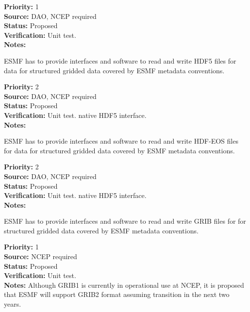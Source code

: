 \begin{reqlist}
{\bf Priority:} 1 \\
{\bf Source:} DAO, NCEP required \\
{\bf Status:} Proposed \\
{\bf Verification:} Unit test. \\
{\bf Notes:}
\end{reqlist}


ESMF has to provide interfaces and software to read and write HDF5
files for data for structured gridded data covered by ESMF metadata 
conventions. 

\begin{reqlist}
{\bf Priority:} 2 \\
{\bf Source:} DAO, NCEP required \\
{\bf Status:} Proposed \\
{\bf Verification:} Unit test. 
native HDF5 interface. \\
{\bf Notes:}
\end{reqlist}


ESMF has to provide interfaces and software to read and write HDF-EOS
files for data for structured gridded data covered by ESMF metadata 
conventions. 

\begin{reqlist}
{\bf Priority:} 2 \\
{\bf Source:} DAO, NCEP required \\
{\bf Status:} Proposed \\
{\bf Verification:} Unit test. 
native HDF5 interface. \\
{\bf Notes:}
\end{reqlist}


ESMF has to provide interfaces and software to read and write GRIB
files for for structured gridded data covered by ESMF metadata conventions. 

\begin{reqlist}
{\bf Priority:} 1 \\
{\bf Source:} NCEP required \\
{\bf Status:} Proposed \\
{\bf Verification:} Unit test. \\
{\bf Notes:} Although GRIB1 is currently in operational use at NCEP,
it is proposed that ESMF will support GRIB2 format assuming transition
in the next two years.
\end{reqlist}

